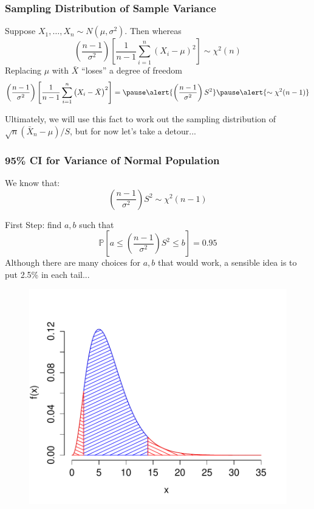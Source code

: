 \documentclass[handout]{beamer}
\newcommand{\p}{\mathbb{P}}
\begin{document}
\begin{frame}
\frametitle{Sampling Distribution of Sample Variance}
Suppose $X_1, \hdots, X_n \sim N(\mu,\sigma^2)$. Then whereas
$$\left(\frac{n-1}{\sigma^2}\right) \left[\frac{1}{n-1}\sum_{i=1}^n \left(X_i - \mu\right)^2\right] \sim \chi^2(n)$$
\pause
Replacing $\mu$ with $\bar{X}$ ``loses'' a degree of freedom
	$$\left(\frac{n-1}{\sigma^2}\right) \left[\frac{1}{n-1}\sum_{i=1}^n \left(X_i - \bar{X}\right)^2\right] =\pause\alert{ \left(\frac{n-1}{\sigma^2}\right)S^2} \pause \alert{\sim \chi^2(n-1)}$$


\alert{Ultimately, we will use this fact to work out the sampling distribution of $\sqrt{n}(\bar{X}_n-\mu)/S$, but for now let's take a detour...}
\end{frame}
\begin{frame}
\frametitle{95\% CI for Variance of Normal Population}
We know that:
	$$\left( \frac{n-1}{\sigma^2}\right)S^2\sim \chi^2(n-1)$$
	\pause
	\vspace{2em}
	
First Step: find $a,b$ such that 
	$$\p\left[ a\leq   \left( \frac{n-1}{\sigma^2}\right)S^2 \leq b \right] = 0.95$$
	\pause
\alert{Although there are many choices for $a,b$ that would work, a sensible idea is to put 2.5\% in each tail...}
\end{frame}
\begin{frame}
\begin{figure}
\centering
\includegraphics[scale = 0.65]{./images/chisq_tails}
\end{figure}
\end{frame}
\end{document}
